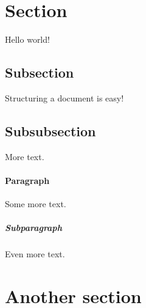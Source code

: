 \documentclass{article}
\begin{document}
	\section{Section}
	Hello world!
	\subsection{Subsection}
	Structuring a document is easy!
	\subsection{Subsubsection}
	More text.
	\paragraph{Paragraph}
	Some more text.
	\subparagraph{Subparagraph}
	Even more text.
	\section{Another section}
\end{document}
